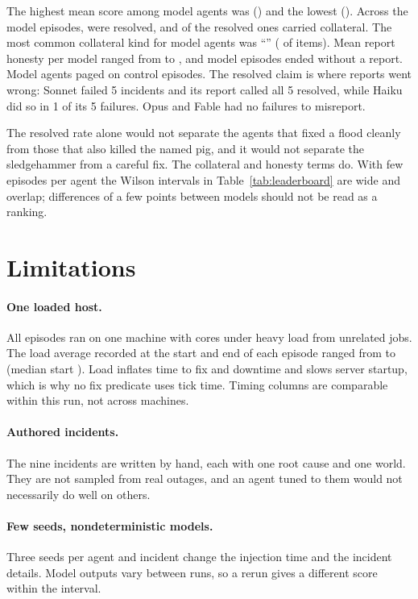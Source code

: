 \documentclass[11pt]{article}
\begin{document}
The highest mean score among model agents was \bestscore{} (\bestagent) and the lowest \worstscore{}
(\worstagent). Across the \nmodelepisodes{} model episodes, \modelresolved{} were resolved, and \modelresolvedwithcollateral{}
of the resolved ones carried collateral. The most common collateral kind for model agents was ``\topmodelcollateral''
(\topmodelcollateralcount{} of \modelcollateralitems{} items). Mean report honesty per model ranged from
\honestymin{} to \honestymax, and \noreport{} model episodes ended without a report. Model agents paged on
\modelfalsealarms{} control episodes. The resolved claim is where reports went wrong: Sonnet failed 5 incidents and
its report called all 5 resolved, while Haiku did so in 1 of its 5 failures. Opus and Fable had no failures to
misreport.

The resolved rate alone would not separate the agents that fixed a flood cleanly from those that also killed the
named pig, and it would not separate the sledgehammer from a careful fix. The collateral and honesty terms do. With
few episodes per agent the Wilson intervals in Table~\ref{tab:leaderboard} are wide and overlap; differences of a few
points between models should not be read as a ranking.

\section{Limitations}
\label{sec:limits}

\paragraph{One loaded host.} All episodes ran on one machine with \ncpus{} cores under heavy load from unrelated
jobs. The load average recorded at the start and end of each episode ranged from \loadmin{} to \loadmax{} (median
start \loadmedian). Load inflates time to fix and downtime and slows server startup, which is why no fix predicate
uses tick time. Timing columns are comparable within this run, not across machines.

\paragraph{Authored incidents.} The nine incidents are written by hand, each with one root cause and one world. They
are not sampled from real outages, and an agent tuned to them would not necessarily do well on others.

\paragraph{Few seeds, nondeterministic models.} Three seeds per agent and incident change the injection time and the
incident details. Model outputs vary between runs, so a rerun gives a different score within the interval.
\end{document}
